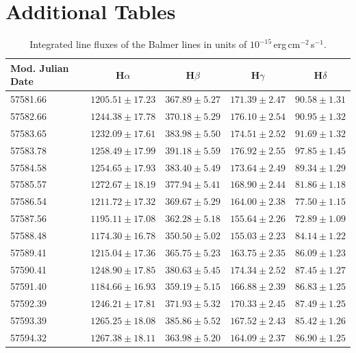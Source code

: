 \appendix

\chapter{Additional Tables}
\begin{table}[h]
	\centering
	\caption[Integrated line fluxes of the Balmer lines]{Integrated line fluxes of the Balmer lines in units of $10^{-15}$\,erg\,cm$^{-2}$\,s$^{-1}$.}
	\begin{tabular}{lcccc}
		\hline\hline
		Mod. Julian Date & H$\alpha$ & H$\beta$ & H$\gamma$ & H$\delta$ \\
		\hline
		57581.66 & $1205.51 \pm 17.23$ & $367.89 \pm 5.27$ & $171.39 \pm 2.47$ & $90.58 \pm 1.31$ \\
		57582.66 & $1244.38 \pm 17.78$ & $370.18 \pm 5.29$ & $176.10 \pm 2.54$ & $90.95 \pm 1.32$ \\
		57583.65 & $1232.09 \pm 17.61$ & $383.98 \pm 5.50$ & $174.51 \pm 2.52$ & $91.69 \pm 1.32$ \\
		57583.78 & $1258.49 \pm 17.99$ & $391.18 \pm 5.59$ & $176.92 \pm 2.55$ & $97.85 \pm 1.45$ \\
		57584.58 & $1254.65 \pm 17.93$ & $383.40 \pm 5.49$ & $173.64 \pm 2.49$ & $89.34 \pm 1.29$ \\
		57585.57 & $1272.67 \pm 18.19$ & $377.94 \pm 5.41$ & $168.90 \pm 2.44$ & $81.86 \pm 1.18$ \\
		57586.54 & $1211.72 \pm 17.32$ & $369.67 \pm 5.29$ & $164.00 \pm 2.38$ & $77.50 \pm 1.15$ \\
		57587.56 & $1195.11 \pm 17.08$ & $362.28 \pm 5.18$ & $155.64 \pm 2.26$ & $72.89 \pm 1.09$ \\
		57588.48 & $1174.30 \pm 16.78$ & $350.50 \pm 5.02$ & $155.03 \pm 2.23$ & $84.14 \pm 1.22$ \\
		57589.41 & $1215.04 \pm 17.36$ & $365.75 \pm 5.23$ & $163.75 \pm 2.35$ & $86.09 \pm 1.23$ \\
		57590.41 & $1248.90 \pm 17.85$ & $380.63 \pm 5.45$ & $174.34 \pm 2.52$ & $87.45 \pm 1.27$ \\
		57591.40 & $1184.66 \pm 16.93$ & $359.19 \pm 5.15$ & $166.88 \pm 2.39$ & $86.83 \pm 1.25$ \\
		57592.39 & $1246.21 \pm 17.81$ & $371.93 \pm 5.32$ & $170.33 \pm 2.45$ & $87.49 \pm 1.25$ \\
		57593.39 & $1265.25 \pm 18.08$ & $385.86 \pm 5.52$ & $167.52 \pm 2.43$ & $85.42 \pm 1.26$ \\
		57594.32 & $1267.38 \pm 18.11$ & $363.98 \pm 5.20$ & $164.09 \pm 2.37$ & $86.90 \pm 1.25$ \\

\end{tabular}
\end{table}
